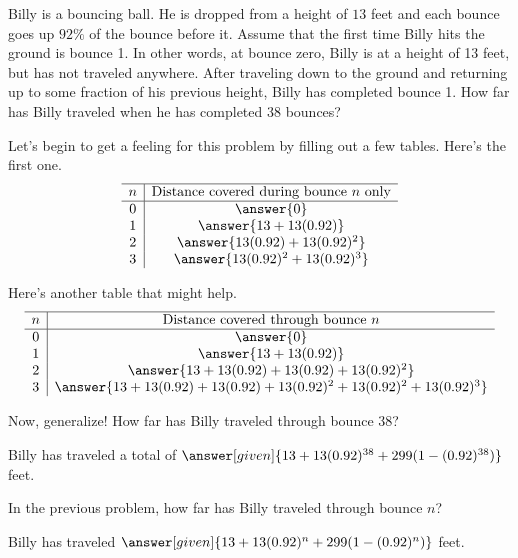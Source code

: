 \documentclass[nooutcomes]{ximera}
\begin{document}
\begin{problem}
Billy is a bouncing ball.  He is dropped from a height of $13$ feet and each bounce goes up $92\%$ of the bounce before it.  Assume that the first time Billy hits the ground is bounce 1.  In other words, at bounce zero, Billy is at a height of 13 feet, but has not traveled anywhere.  After traveling down to the ground and returning up to some fraction of his previous height, Billy has completed bounce 1.  How far has Billy traveled when he has completed $38$ bounces?

Let's begin to get a feeling for this problem by filling out a few tables.  Here's the first one.
\[
\begin{array}{c|c} \hline
n & \text{Distance covered during bounce $n$ only} \\ \hline
0 & \answer{0} \\
1 & \answer{13+13(0.92)} \\
2 & \answer{13(0.92)+13(0.92)^2}\\
3 & \answer{13(0.92)^2 + 13(0.92)^3}\\
\end{array}
\]

Here's another table that might help.
\[
\begin{array}{c|c} \hline
n & \text{Distance covered through bounce $n$} \\ \hline
0 & \answer{0} \\
1 & \answer{13+13(0.92)} \\
2 & \answer{13+13(0.92)+13(0.92)+13(0.92)^2}\\
3 & \answer{13+13(0.92)+13(0.92)+13(0.92)^2+13(0.92)^2 + 13(0.92)^3}\\
\end{array}
\]

Now, generalize!  How far has Billy traveled through bounce $38$?

\begin{prompt}
Billy has traveled a total of $\answer[given]{13+13(0.92)^{38} + 299(1-(0.92)^{38})}$ feet.
\end{prompt}

\end{problem}


\begin{problem}
In the previous problem, how far has Billy traveled through bounce $n$?

\begin{prompt}
Billy has traveled $\answer[given]{13+13(0.92)^n + 299(1-(0.92)^n)}$ feet.
\end{prompt}
\end{problem}
\end{document}
